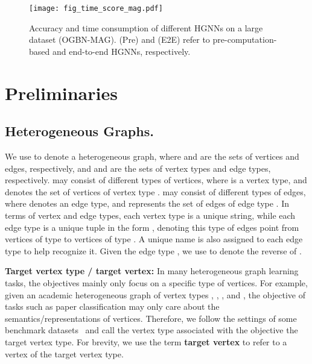 \documentclass[lettersize,journal]{IEEEtran}
\begin{document}
\begin{figure}[!tp]
\centering\texttt{[image: fig\_time\_score\_mag.pdf]}
\vspace{-3mm}
\caption{
Accuracy and time consumption of different HGNNs on a large dataset (OGBN-MAG).
(Pre) and (E2E) refer to pre-computation-based and end-to-end HGNNs, respectively.
}
 \label{fig:intro}
 \vspace{-4mm}
\end{figure}






\section{Preliminaries}



\subsection{Heterogeneous Graphs.} 




We use  to denote a heterogeneous graph, where  and  are the sets of vertices and edges, respectively, and  and  are the sets of vertex types and edge types, respectively.
 may consist of different types of vertices, where  is a vertex type, and  denotes the set of vertices of vertex type .
 may consist of different types of edges, where  denotes an edge type, and  represents the set of edges of edge type .
In terms of vertex and edge types, each vertex type is a unique string, while each edge type is a unique tuple in the form , denoting this type of edges point from vertices of type  to vertices of type .
A unique name is also assigned to each edge type to help recognize it.
Given the edge type , we use  to denote the reverse of .






\textbf{Target vertex type / target vertex: } In many heterogeneous graph learning tasks, the objectives mainly only focus on a specific type of vertices.
For example, given an academic heterogeneous graph of vertex types , , , and , the objective of tasks such as paper classification may only care about the semantics/representations of  vertices.
Therefore, we follow the settings of some benchmark datasets~\cite{DBLP:conf/kdd/LvDLCFHZJDT21,DBLP:conf/nips/HuFZDRLCL20} and call the vertex type associated with the objective the target vertex type.
For brevity, we use the term \textbf{target vertex} to refer to a vertex of the target vertex type.
\end{document}
